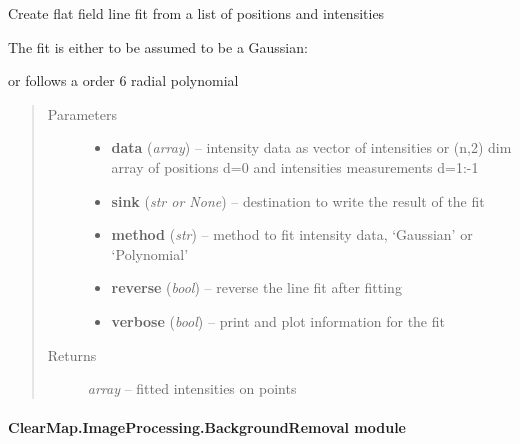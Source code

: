 \documentclass[letterpaper,10pt,english]{sphinxmanual}
\begin{document}

\begin{fulllineitems}
\label{api/ClearMap.ImageProcessing:ClearMap.ImageProcessing.IlluminationCorrection.flatfieldLineFromRegression}
Create flat field line fit from a list of positions and intensities

The fit is either to be assumed to be a Gaussian:

or follows a order 6 radial polynomial
\begin{quote}\begin{description}
\item[{Parameters}] \leavevmode\begin{itemize}
\item {} 
\textbf{data} (\emph{array}) --
intensity data as vector of intensities or (n,2) dim array of positions d=0 and intensities measurements d=1:-1

\item {} 
\textbf{sink} (\emph{str or None}) --
destination to write the result of the fit

\item {} 
\textbf{method} (\emph{str}) --
method to fit intensity data, `Gaussian' or `Polynomial'

\item {} 
\textbf{reverse} (\emph{bool}) --
reverse the line fit after fitting

\item {} 
\textbf{verbose} (\emph{bool}) --
print and plot information for the fit

\end{itemize}

\item[{Returns}] \leavevmode
\emph{array} --
fitted intensities on points

\end{description}\end{quote}

\end{fulllineitems}



\paragraph{ClearMap.ImageProcessing.BackgroundRemoval module}
\label{api/ClearMap.ImageProcessing:clearmap-imageprocessing-backgroundremoval-module}
\end{document}

